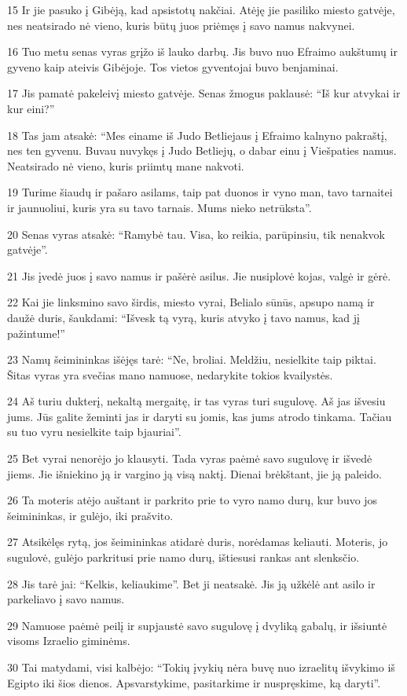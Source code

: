 \par 15 Ir jie pasuko į Gibėją, kad apsistotų nakčiai. Atėję jie pasiliko miesto gatvėje, nes neatsirado nė vieno, kuris būtų juos priėmęs į savo namus nakvynei. 
\par 16 Tuo metu senas vyras grįžo iš lauko darbų. Jis buvo nuo Efraimo aukštumų ir gyveno kaip ateivis Gibėjoje. Tos vietos gyventojai buvo benjaminai. 
\par 17 Jis pamatė pakeleivį miesto gatvėje. Senas žmogus paklausė: “Iš kur atvykai ir kur eini?” 
\par 18 Tas jam atsakė: “Mes einame iš Judo Betliejaus į Efraimo kalnyno pakraštį, nes ten gyvenu. Buvau nuvykęs į Judo Betliejų, o dabar einu į Viešpaties namus. Neatsirado nė vieno, kuris priimtų mane nakvoti. 
\par 19 Turime šiaudų ir pašaro asilams, taip pat duonos ir vyno man, tavo tarnaitei ir jaunuoliui, kuris yra su tavo tarnais. Mums nieko netrūksta”. 
\par 20 Senas vyras atsakė: “Ramybė tau. Visa, ko reikia, parūpinsiu, tik nenakvok gatvėje”. 
\par 21 Jis įvedė juos į savo namus ir pašėrė asilus. Jie nusiplovė kojas, valgė ir gėrė. 
\par 22 Kai jie linksmino savo širdis, miesto vyrai, Belialo sūnūs, apsupo namą ir daužė duris, šaukdami: “Išvesk tą vyrą, kuris atvyko į tavo namus, kad jį pažintume!” 
\par 23 Namų šeimininkas išėjęs tarė: “Ne, broliai. Meldžiu, nesielkite taip piktai. Šitas vyras yra svečias mano namuose, nedarykite tokios kvailystės. 
\par 24 Aš turiu dukterį, nekaltą mergaitę, ir tas vyras turi sugulovę. Aš jas išvesiu jums. Jūs galite žeminti jas ir daryti su jomis, kas jums atrodo tinkama. Tačiau su tuo vyru nesielkite taip bjauriai”. 
\par 25 Bet vyrai nenorėjo jo klausyti. Tada vyras paėmė savo sugulovę ir išvedė jiems. Jie išniekino ją ir vargino ją visą naktį. Dienai brėkštant, jie ją paleido. 
\par 26 Ta moteris atėjo auštant ir parkrito prie to vyro namo durų, kur buvo jos šeimininkas, ir gulėjo, iki prašvito. 
\par 27 Atsikėlęs rytą, jos šeimininkas atidarė duris, norėdamas keliauti. Moteris, jo sugulovė, gulėjo parkritusi prie namo durų, ištiesusi rankas ant slenksčio. 
\par 28 Jis tarė jai: “Kelkis, keliaukime”. Bet ji neatsakė. Jis ją užkėlė ant asilo ir parkeliavo į savo namus. 
\par 29 Namuose paėmė peilį ir supjaustė savo sugulovę į dvyliką gabalų, ir išsiuntė visoms Izraelio giminėms. 
\par 30 Tai matydami, visi kalbėjo: “Tokių įvykių nėra buvę nuo izraelitų išvykimo iš Egipto iki šios dienos. Apsvarstykime, pasitarkime ir nuspręskime, ką daryti”.



